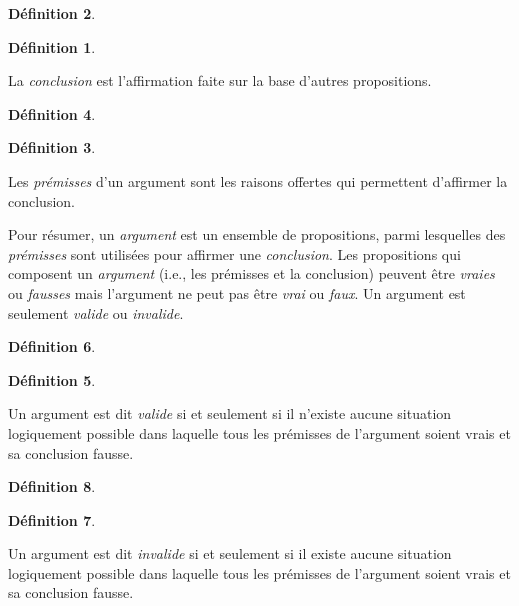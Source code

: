 \documentclass[
  a4paper,11pt,twoside,onecolumn,openright,final,oldfontcommands]{memoir}
\theoremstyle{definition}
\newtheorem{definition}{Définition}[chapter]
\theoremstyle{definition}
\theoremstyle{definition}
\theoremstyle{remark}
\begin{document}
\begin{definition}
\begin{definition}
\protect\hypertarget{def:unlabeled-div-2}{}\label{def:unlabeled-div-2}

\protect\hypertarget{def:concusion}{}{\label{def:concusion} }La \emph{conclusion} est l'affirmation faite sur la base d'autres propositions.

\end{definition}
\end{definition}

\begin{definition}
\begin{definition}
\protect\hypertarget{def:unlabeled-div-3}{}\label{def:unlabeled-div-3}

\protect\hypertarget{def:pruxe9misse}{}{\label{def:prémisse} }Les \emph{prémisses} d'un argument sont les raisons offertes qui permettent d'affirmer la conclusion.

\end{definition}
\end{definition}

Pour résumer, un \emph{argument} est un ensemble de propositions, parmi lesquelles des \emph{prémisses} sont utilisées pour affirmer une \emph{conclusion}. Les propositions qui composent un \emph{argument} (i.e., les prémisses et la conclusion) peuvent être \emph{vraies} ou \emph{fausses} mais l'argument ne peut pas être \emph{vrai} ou \emph{faux}. Un argument est seulement \emph{valide} ou \emph{invalide}.

\begin{definition}
\begin{definition}
\protect\hypertarget{def:unlabeled-div-4}{}\label{def:unlabeled-div-4}

\protect\hypertarget{def:valide}{}{\label{def:valide} }Un argument est dit \emph{valide} si et seulement si il n'existe aucune situation logiquement possible dans laquelle tous les prémisses de l'argument soient vrais et sa conclusion fausse.

\end{definition}
\end{definition}

\begin{definition}
\begin{definition}
\protect\hypertarget{def:unlabeled-div-5}{}\label{def:unlabeled-div-5}

\protect\hypertarget{def:invalide}{}{\label{def:invalide} }Un argument est dit \emph{invalide} si et seulement si il existe aucune situation logiquement possible dans laquelle tous les prémisses de l'argument soient vrais et sa conclusion fausse.

\end{definition}
\end{definition}
\end{document}
